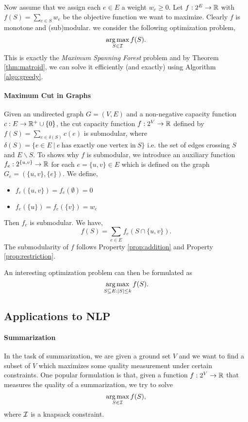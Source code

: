 Now assume that we assign each $e\in E$ a weight $w_e \geq 0$. Let $f: 2^E\rightarrow \mathbb{R}$ with $f(S) = \sum_{e\in S}w_e$ be the objective function we want to maximize. Clearly $f$ is monotone and (sub)modular. we consider the following optimization problem,
$$\operatorname*{arg\,max}_{S \in \mathcal{I}} f(S).$$
This is exactly the \emph{Maximum Spanning Forest} problem and by Theorem \ref{thm:matroid}, we can solve it efficiently (and exactly) using Algorithm \ref{algo:greedy}.


\paragraph{Maximum Cut in Graphs}
Given an undirected graph $G = (V, E)$ and a non-negative capacity function $c: E \rightarrow \mathbb{R}^+\cup\{0\}$, the cut capacity function $f:2^V \rightarrow \mathbb{R}$ defined by $f(S) = \sum_{e\in \delta(S)} c(e)$ is submodular, where $\delta(S) = \{e\in E~|~e~\text{has exactly one vertex in}~S\}$ i.e. the set of edges crossing $S$ and $E\backslash S$. To shows why $f$ is submodular, we introduce an auxiliary function $f_e: 2^{\{u, v\}} \rightarrow \mathbb{R}$ for each $e = \{u, v\}\in E$ which is defined on the graph $G_e = (\{u,v\}, \{e\})$. We define, 
\begin{itemize}
\item $f_e(\{u, v\}) = f_e(\emptyset) = 0$
\item $f_e(\{u\}) = f_e(\{v\}) = w_e$
\end{itemize}
Then $f_e$ is submodular. We have,
$$f(S) = \sum_{e\in E} f_e(S \cap \{u, v\}).$$
The submodularity of $f$ follows Property \ref{prop:addition} and Property \ref{prop:restriction}.

An interesting optimization problem can then be formulated as 
$$\operatorname*{arg\,max}_{S\subseteq E: |S| \leq k} f(S).$$





\subsection{Applications to NLP}
\paragraph{Summarization}
In the task of summarization, we are given a ground set $V$ and we want to find a subset of $V$ which maximizes some quality measurement under certain constraints. One popular formulation is that, given a function $f: 2^V \rightarrow \mathbb{R}$ that measures the quality of a summarization, we try to solve
$$\operatorname*{arg\,max}_{S\in\mathcal{I}} f(S),$$
where $\mathcal{I}$ is a knapsack constraint.

